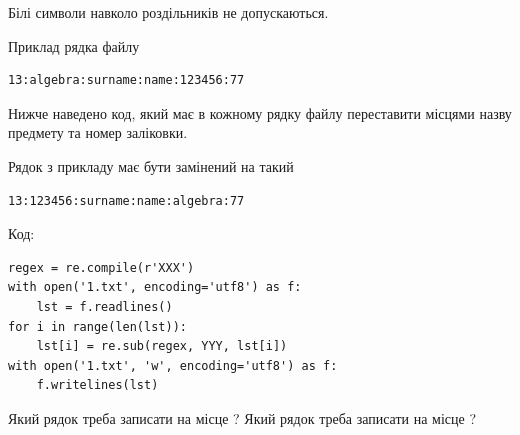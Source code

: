 \documentclass[12pt, ukrainian]{article}
\begin{document}
{Білі символи навколо роздільників не допускаються.

Приклад рядка файлу



\begin{verbatim}
13:algebra:surname:name:123456:77
\end{verbatim}


Нижче наведено код, який має в кожному рядку файлу переставити місцями назву предмету та номер заліковки.

Рядок з прикладу має бути замінений на такий



\begin{verbatim}
13:123456:surname:name:algebra:77
\end{verbatim}




Код:



\begin{verbatim}
regex = re.compile(r'XXX')
with open('1.txt', encoding='utf8') as f:
    lst = f.readlines()
for i in range(len(lst)):
    lst[i] = re.sub(regex, YYY, lst[i])
with open('1.txt', 'w', encoding='utf8') as f:
    f.writelines(lst)
\end{verbatim}





Який рядок треба записати на місце  ?
Який рядок треба записати на місце  ?\par

}
\newpage
\end{document}
